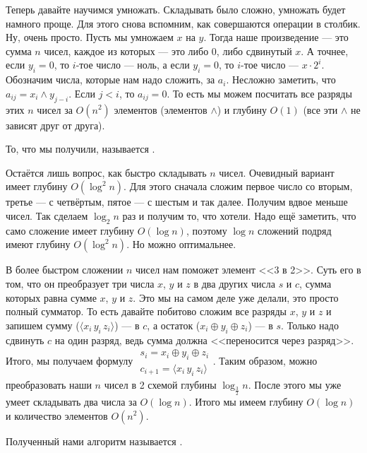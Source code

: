 \documentclass{article}
\begin{document}
\begin{itemize}
\begin{Comment}
        \end{Comment}
        \begin{Example}
            Теперь давайте научимся умножать. Складывать было сложно, умножать будет намного проще. Для этого снова вспомним, как совершаются операции в столбик. Ну, очень просто. Пусть мы умножаем $x$ на $y$. Тогда наше произведение --- это сумма $n$ чисел, каждое из которых --- это либо $0$, либо сдвинутый $x$. А точнее, если $y_i=0$, то $i$-тое число --- ноль, а если $y_i=0$, то $i$-тое число --- $x\cdot2^i$. Обозначим числа, которые нам надо сложить, за $a_i$. Несложно заметить, что $a_{ij}=x_i\land y_{j-i}$. Если $j<i$, то $a_{ij}=0$. То есть мы можем посчитать все разряды этих $n$ чисел за $O(n^2)$ элементов (элементов $\land$) и глубину $O(1)$ (все эти $\land$ не зависят друг от друга).
        \end{Example}
        \dfn То, что мы получили, называется .
        \begin{Example}
            Остаётся лишь вопрос, как быстро складывать $n$ чисел. Очевидный вариант имеет глубину $O(\log^2n)$. Для этого сначала сложим первое число со вторым, третье --- с четвёртым, пятое --- с шестым и так далее. Получим вдвое меньше чисел. Так сделаем $\log_2n$ раз и получим то, что хотели. Надо ещё заметить, что само сложение имеет глубину $O(\log n)$, поэтому $\log n$ сложений подряд имеют глубину $O(\log^2n)$. Но можно оптимальнее.
        \end{Example}
        \begin{Example}
            В более быстром сложении $n$ чисел нам поможет элемент <<3 в 2>>. Суть его в том, что он преобразует три числа $x$, $y$ и $z$ в два других числа $s$ и $c$, сумма которых равна сумме $x$, $y$ и $z$. Это мы на самом деле уже делали, это просто полный сумматор. То есть давайте побитово сложим все разряды $x$, $y$ и $z$ и запишем сумму ($\langle x_i\,y_i\,z_i\rangle$) --- в $c$, а остаток ($x_i\oplus y_i\oplus z_i$) --- в $s$. Только надо сдвинуть $c$ на один разряд, ведь сумма должна <<переносится через разряд>>. Итого, мы получаем формулу $\substack{s_i=x_i\oplus y_i\oplus z_i\\c_{i+1}=\langle x_i\,y_i\,z_i\rangle}$. Таким образом, можно преобразовать наши $n$ чисел в 2 схемой глубины $\log_{\frac32}n$. После этого мы уже умеет складывать два числа за $O(\log n)$. Итого мы имеем глубину $O(\log n)$ и количество элементов $O(n^2)$.
        \end{Example}
        \dfn Полученный нами алгоритм называется .

\end{itemize}
\end{document}
